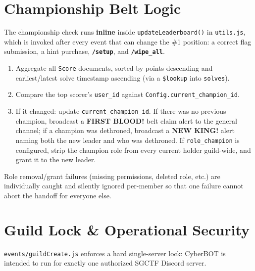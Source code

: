 \documentclass[12pt,a4paper]{report}
\newcommand{\cmd}[1]{\texttt{\color{cybercyan}\textbf{#1}}}
\newcommand{\file}[1]{\texttt{\color{cyberpurple!80!black}#1}}
\newcommand{\note}[1]{
    \begin{tcolorbox}[colback=cyberblue!5, colframe=cyberblue,
        title=\textbf{NOTE}, fonttitle=\sffamily\small]
    #1
    \end{tcolorbox}
}
\begin{document}
\newpage
\chapter{Championship Belt Logic}

The championship check runs \textbf{inline} inside \texttt{updateLeaderboard()} in
\file{utils.js}, which is invoked after every event that can change the \#1 position: a correct
flag submission, a hint purchase, \cmd{/setup}, and \cmd{/wipe\_all}.

\begin{enumerate}
    \item Aggregate all \texttt{Score} documents, sorted by points descending and earliest/latest
          solve timestamp ascending (via a \texttt{\$lookup} into \texttt{solves}).
    \item Compare the top scorer's \texttt{user\_id} against \texttt{Config.current\_champion\_id}.
    \item If it changed: update \texttt{current\_champion\_id}. If there was no previous champion,
          broadcast a \textbf{FIRST BLOOD!} belt claim alert to the general channel; if a champion was
          dethroned, broadcast a \textbf{NEW KING!} alert naming both the new leader and who was dethroned.
          If \texttt{role\_champion} is configured, strip the champion role from every current holder
          guild-wide, and grant it to the new leader.
\end{enumerate}

\note{
Role removal/grant failures (missing permissions, deleted role, etc.) are individually caught and
silently ignored per-member so that one failure cannot abort the handoff for everyone else.
}

\chapter{Guild Lock \& Operational Security}

\file{events/guildCreate.js} enforces a hard single-server lock: CyberBOT is intended to run for
exactly one authorized SGCTF Discord server.
\end{document}
